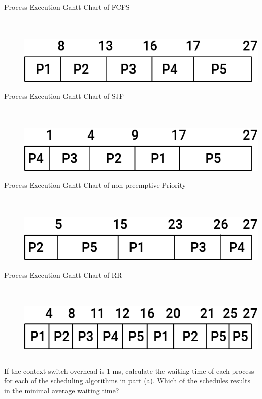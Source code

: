 \documentclass{article}
\begin{document}
\begin{description}
    \item[Process Execution Gantt Chart of FCFS] \hfill 
    \\
    \\ 
    \includegraphics[width=1\linewidth]{./fcfs.png}
    \item[Process Execution Gantt Chart of SJF] \hfill 
    \\
    \\ 
    \includegraphics[width=1\linewidth]{./sjf.png}
    \item[Process Execution Gantt Chart of non-preemptive Priority] \hfill 
    \\
    \\ 
    \includegraphics[width=1\linewidth]{./priority.png}
    \item[Process Execution Gantt Chart of RR] \hfill 
    \\
    \\ 
    \includegraphics[width=1\linewidth]{./rr.png}
\end{description}

\subsection{} If the context-switch overhead is 1 ms, calculate the waiting time of each process for
each of the scheduling algorithms in part (a). Which of the schedules results in the minimal
average waiting time? 
\end{document}
